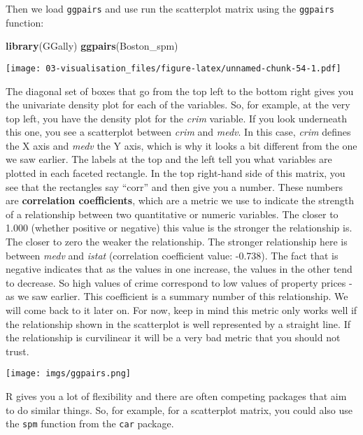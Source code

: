 \documentclass[
]{book}
\newenvironment{Shaded}{\begin{snugshade}}{\end{snugshade}}
\newcommand{\FunctionTok}[1]{\textcolor[rgb]{0.13,0.29,0.53}{\textbf{#1}}}
\newcommand{\NormalTok}[1]{#1}
\begin{document}
Then we load \texttt{ggpairs} and use run the scatterplot matrix using the \texttt{ggpairs} function:

\begin{Shaded}
\begin{Highlighting}[]
\FunctionTok{library}\NormalTok{(GGally)}
\FunctionTok{ggpairs}\NormalTok{(Boston\_spm)}
\end{Highlighting}
\end{Shaded}

\texttt{[image: 03-visualisation\_files/figure-latex/unnamed-chunk-54-1.pdf]}

The diagonal set of boxes that go from the top left to the bottom right gives you the univariate density plot for each of the variables. So, for example, at the very top left, you have the density plot for the \emph{crim} variable. If you look underneath this one, you see a scatterplot between \emph{crim} and \emph{medv}. In this case, \emph{crim} defines the X axis and \emph{medv} the Y axis, which is why it looks a bit different from the one we saw earlier. The labels at the top and the left tell you what variables are plotted in each faceted rectangle. In the top right-hand side of this matrix, you see that the rectangles say ``corr'' and then give you a number. These numbers are \textbf{correlation coefficients}, which are a metric we use to indicate the strength of a relationship between two quantitative or numeric variables. The closer to 1.000 (whether positive or negative) this value is the stronger the relationship is. The closer to zero the weaker the relationship. The stronger relationship here is between \emph{medv} and \emph{istat} (correlation coefficient value: -0.738). The fact that is negative indicates that as the values in one increase, the values in the other tend to decrease. So high values of crime correspond to low values of property prices -as we saw earlier. This coefficient is a summary number of this relationship. We will come back to it later on. For now, keep in mind this metric only works well if the relationship shown in the scatterplot is well represented by a straight line. If the relationship is curvilinear it will be a very bad metric that you should not trust.

\texttt{[image: imgs/ggpairs.png]}

R gives you a lot of flexibility and there are often competing packages that aim to do similar things. So, for example, for a scatterplot matrix, you could also use the \texttt{spm} function from the \texttt{car} package.
\end{document}
